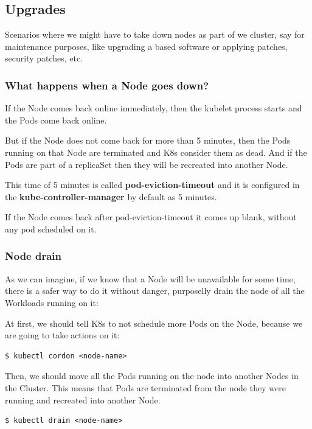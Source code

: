 \documentclass{article}
\newenvironment{codetemplate}[1][]{%
  \mybasecolorbox[#1]
  \itshape
}{%
  \endmybasecolorbox
}
\begin{document}
\subsection{Upgrades}
Scenarios where we might have to take down nodes as part of we cluster, say for maintenance purposes, like upgrading a based software or applying patches, security patches, etc.

\subsubsection{What happens when a Node goes down?} 
If the Node comes back online immediately, then the kubelet process starts and the Pods come back online. 

But if the Node does not come back for more than 5 minutes, then the Pods running on that Node are terminated and K8s consider them as dead. And if the Pods are part of a replicaSet then they will be recreated into another Node.

This time of 5 minutes is called \textbf{pod-eviction-timeout} and it is configured in the \textbf{kube-controller-manager} by default as 5 minutes.

If the Node comes back after pod-eviction-timeout it comes up blank, without any pod scheduled on it.

\subsubsection{Node drain}

As we can imagine, if we know that a Node will be unavailable for some time, there is a safer way to do it without danger, purposelly drain the node of all the Workloads running on it:

At first, we should tell K8s to not schedule more Pods on the Node, because we are going to take actions on it:
\begin{codetemplate}{}
\begin{verbatim}
$ kubectl cordon <node-name>
\end{verbatim}
\end{codetemplate}

Then, we should move all the Pods running on the node into another Nodes in the Cluster. This means that Pods are terminated from the node they were running and recreated into another Node.
\begin{codetemplate}{}
\begin{verbatim}
$ kubectl drain <node-name>
\end{verbatim}
\end{codetemplate}
\end{document}
